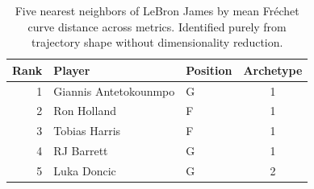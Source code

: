 \begin{table}[htbp]
  \centering\small
  \begin{tabular}{rllc}
    \toprule
    Rank & Player & Position & Archetype \\
    \midrule
    1 & Giannis Antetokounmpo & G & 1 \\
    2 & Ron Holland & F & 1 \\
    3 & Tobias Harris & F & 1 \\
    4 & RJ Barrett & G & 1 \\
    5 & Luka Doncic & G & 2 \\
    \bottomrule
  \end{tabular}
  \caption{Five nearest neighbors of LeBron James by mean Fr\'{e}chet curve distance across metrics. Identified purely from trajectory shape without dimensionality reduction.}
  \label{tab:LeBron_James_frechet_curve_neighbors}
\end{table}

